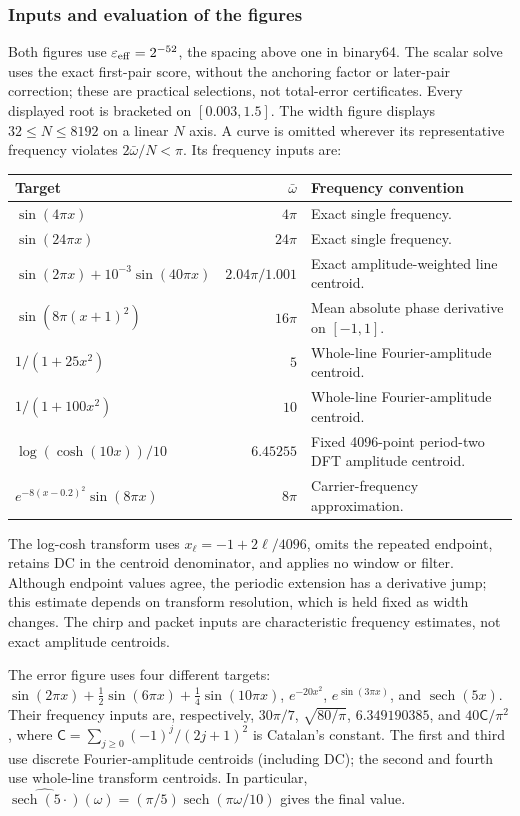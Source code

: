 \subsubsection{Inputs and evaluation of the figures}
Both figures use $\varepsilon_{\rm eff}=2^{-52}$, the spacing above one in
binary64. The scalar solve uses the exact first-pair score, without the
anchoring factor or later-pair correction; these are practical selections,
not total-error certificates. Every displayed root is bracketed on
$[0.003,1.5]$. The width figure displays $32\le N\le8192$ on a linear
$N$ axis. A curve is omitted wherever its representative frequency
violates $2\bar\omega/N<\pi$. Its frequency inputs are:
\begin{center}
\small
\begin{tabularx}{\linewidth}{l r X}
\toprule
Target & $\bar\omega$ & Frequency convention\\
\midrule
$\sin(4\pi x)$ & $4\pi$ & Exact single frequency.\\
$\sin(24\pi x)$ & $24\pi$ & Exact single frequency.\\
$\sin(2\pi x)+10^{-3}\sin(40\pi x)$
 & $2.04\pi/1.001$ & Exact amplitude-weighted line centroid.\\
$\sin(8\pi(x+1)^2)$ & $16\pi$ & Mean absolute phase derivative on $[-1,1]$.\\
$1/(1+25x^2)$ & $5$ & Whole-line Fourier-amplitude centroid.\\
$1/(1+100x^2)$ & $10$ & Whole-line Fourier-amplitude centroid.\\
$\log(\cosh(10x))/10$ & $6.45255$ & Fixed 4096-point period-two DFT amplitude centroid.\\
$e^{-8(x-0.2)^2}\sin(8\pi x)$ & $8\pi$ & Carrier-frequency approximation.\\
\bottomrule
\end{tabularx}
\end{center}
The log-cosh transform uses $x_\ell=-1+2\ell/4096$, omits the repeated
endpoint, retains DC in the centroid denominator, and applies no window or
filter. Although endpoint values agree, the periodic extension has a
derivative jump; this estimate depends on transform resolution, which is
held fixed as width changes. The chirp and packet inputs are characteristic
frequency estimates, not exact amplitude centroids.

The error figure uses four different targets:
$\sin(2\pi x)+\tfrac12\sin(6\pi x)+\tfrac14\sin(10\pi x)$,
$e^{-20x^2}$, $e^{\sin(3\pi x)}$, and $\operatorname{sech}(5x)$.
Their frequency inputs are, respectively,
$30\pi/7$, $\sqrt{80/\pi}$, $6.349190385$, and
$40\mathsf C/\pi^2$, where $\mathsf C=\sum_{j\ge0}(-1)^j/(2j+1)^2$
is Catalan's constant. The first and third use discrete Fourier-amplitude
centroids (including DC); the second and fourth use whole-line transform
centroids. In particular,
$\widehat{\operatorname{sech}(5\cdot)}(\omega)
=(\pi/5)\operatorname{sech}(\pi\omega/10)$ gives the final value.

